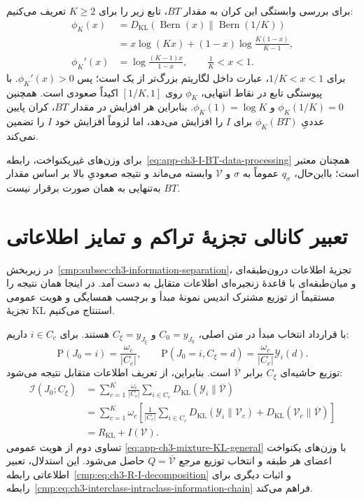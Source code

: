 برای بررسی وابستگی این کران به مقدار $BT$، تابع زیر را برای $K\ge2$ تعریف می‌کنیم:
\begin{equation}\label{eq:app-ch3-I-BT-monotonicity}
\begin{aligned}
\phi_K(x)
&=D_{\mathrm{KL}}\!\left(
\operatorname{Bern}(x)\middle\|
\operatorname{Bern}(1/K)\right)\\
&=x\log(Kx)
+(1-x)\log\frac{K(1-x)}{K-1},\\
\phi_K'(x)
&=\log\frac{(K-1)x}{1-x},
\qquad \frac1K<x<1.
\end{aligned}
\end{equation}
برای $1/K<x<1$، عبارت داخل لگاریتم بزرگ‌تر از یک است؛ پس $\phi_K'(x)>0$. با پیوستگی تابع در نقاط انتهایی، $\phi_K$ روی $[1/K,1]$ اکیداً صعودی است. همچنین $\phi_K(1/K)=0$ و $\phi_K(1)=\log K$. بنابراین هر افزایش در مقدار $BT$، کران پایین عددیِ $\phi_K(BT)$ برای $I$ را افزایش می‌دهد، اما لزوماً افزایش خود $I$ را تضمین نمی‌کند.

برای وزن‌های غیریکنواخت، رابطه~\eqref{eq:app-ch3-I-BT-data-processing} همچنان معتبر است؛ بااین‌حال، $q_\sigma$ عموماً به $\sigma$ و $\mathcal V$ وابسته می‌ماند و نتیجه صعودیِ بالا بر اساس مقدار $BT$ به‌تنهایی به همان صورت برقرار نیست.


\section{تعبیر کانالی تجزیهٔ تراکم و تمایز اطلاعاتی}
\label{app:geometry-R-I-channel}
در زیربخش~\ref{cmp:subsec:ch3-information-separation}،
تجزیهٔ اطلاعات درون‌طبقه‌ای و میان‌طبقه‌ای با
قاعدهٔ زنجیره‌ای اطلاعات متقابل به دست آمد.
در اینجا همان نتیجه را مستقیماً از توزیع مشترک
اندیس نمونهٔ مبدأ و برچسب همسایگی و هویت
عمومی تجزیهٔ KL استنتاج می‌کنیم.

با قرارداد انتخاب مبدأ در متن اصلی،
$C_0=y_{J_0}$ و $C_\xi=y_{J_\xi}$ هستند.
برای $i\in C_c$ داریم:
\[
\mathrm P(J_0=i)=\frac{\omega_c}{|C_c|},
\qquad
\mathrm P(J_0=i,C_\xi=d)
=\frac{\omega_c}{|C_c|}\mathscr Y_i(d).
\]
توزیع حاشیه‌ای $C_\xi$ برابر
$\overline{\mathcal V}$ است. بنابراین، از تعریف
اطلاعات متقابل \cite{CoverThomas2006} نتیجه می‌شود:
\[
\begin{aligned}
\mathcal I(J_0;C_\xi)
&=\sum_{c=1}^{K}\frac{\omega_c}{|C_c|}
\sum_{i\in C_c}
D_{\mathrm{KL}}(\mathscr Y_i\|\overline{\mathcal V})\\
&=\sum_{c=1}^{K}\omega_c\left[
\frac{1}{|C_c|}\sum_{i\in C_c}
D_{\mathrm{KL}}(\mathscr Y_i\|\mathcal V_c)
+D_{\mathrm{KL}}(\mathcal V_c\|\overline{\mathcal V})
\right]\\
&=R_{\mathrm{KL}}+I(\mathcal V).
\end{aligned}
\]
تساوی دوم از هویت عمومی
\eqref{eq:app-ch3-mixture-KL-general}
با وزن‌های یکنواخت اعضای هر طبقه و انتخاب
توزیع مرجع $Q=\overline{\mathcal V}$ حاصل
می‌شود. این استدلال، تعبیر اطلاعاتی
رابطه~\eqref{cmp:eq:ch3-R-I-decomposition}
و اثبات دیگری برای
رابطه~\eqref{cmp:eq:ch3-interclass-intraclass-information-chain}
فراهم می‌کند.

